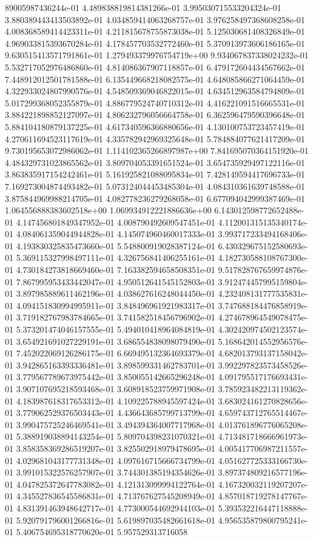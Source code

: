 89005987436244e-01	4.489838819814381266e-01	3.995030715533204324e-01	3.880389443413503892e-01	4.034859414063268757e-01	3.976258497368608258e-01	4.008368589414423311e-01	4.211815678755873038e-01	5.125030681408326849e-01	4.969033815393670284e-01	4.178457703532772460e-01	5.370913973606186165e-01	9.630515413571791861e-01	1.279493379976754719e+00	9.934067837338024232e-01	5.532717052976486860e-01	4.814086367907118857e-01	6.479172604434567662e-01	7.448912012501781588e-01	6.135449668218082575e-01	4.648085866271064459e-01	4.322933024807990576e-01	4.548509369046822015e-01	4.634512963584794809e-01	5.017299368052355879e-01	4.886779524740710312e-01	4.416221091516665531e-01	3.884221898852127097e-01	4.806232796056664758e-01	6.362596479590396648e-01	5.884104180879137225e-01	4.617340596366880656e-01	4.130100753723457419e-01	4.270611694523117619e-01	4.335782942969325648e-01	5.784884077621417209e-01	9.730195653072986062e-01	1.114102365266897987e+00	7.841695070364151920e-01	4.484329731023865562e-01	3.809704053391651524e-01	3.654735929497122116e-01	3.863835917154242461e-01	5.161925821088095834e-01	7.428149594417696733e-01	7.169273004874493482e-01	5.073124044453485304e-01	4.084310361639748588e-01	3.875844969988214705e-01	4.082778236279268058e-01	6.677094042999387469e-01	1.064556888383602518e+00	1.069934912221886636e+00	6.143012598772652488e-01	4.147456801849347952e-01	4.008790492609547451e-01	4.112001315135340174e-01	4.084061359044944828e-01	4.145074960460017333e-01	3.993717233494168406e-01	4.193830325835473660e-01	5.548800919028387124e-01	6.430329675152580693e-01	5.369115327998497111e-01	4.326756841406255161e-01	4.182730588108767300e-01	4.730184273818669460e-01	7.163382594658508351e-01	9.517828767659974876e-01	7.867995953433442047e-01	4.950512641545152803e-01	3.912474457995159804e-01	3.897985889611462196e-01	4.038627616248044450e-01	4.232408131777535831e-01	4.094151830994995911e-01	3.848496961921983317e-01	3.747688184476858919e-01	3.719182767983784665e-01	3.741582518456796902e-01	4.274678964549078475e-01	5.373201474046157555e-01	5.494010418964084819e-01	4.302420974502123574e-01	3.654921691027229191e-01	3.686554838098079490e-01	5.168642014552956576e-01	7.452022069126286175e-01	6.669495132364693379e-01	4.682013793137158042e-01	3.942865163393336481e-01	3.898599331462783701e-01	3.992297823573458526e-01	3.779567789673975442e-01	3.850055142665296248e-01	4.091795517176693431e-01	3.907107695218593468e-01	3.608918523759971908e-01	3.785923482213119362e-01	4.183987618317653312e-01	4.109225788945597424e-01	3.683024161270828656e-01	3.779062529376503443e-01	4.436643685799713799e-01	4.659743712765514467e-01	3.990475725246469541e-01	3.494394364007717968e-01	4.013761896776065208e-01	5.388919038894143254e-01	5.809704398231070321e-01	4.713481718666961973e-01	3.858358369286519207e-01	3.825502918979478695e-01	4.005417706987211557e-01	4.029681043177731348e-01	4.097616715666734799e-01	4.051627725333166730e-01	3.991015322576257907e-01	3.744301385194354626e-01	3.897374809216577196e-01	4.047825372647783082e-01	4.121313099994122764e-01	4.167320032119207207e-01	4.345527836545586831e-01	4.713767627545208949e-01	4.857018719278147767e-01	4.831391463948642717e-01	4.773000544692944103e-01	5.393532216447118888e-01	5.920791796001266816e-01	5.619897035482661618e-01	4.956535879800795241e-01	5.406754695318770620e-01	5.957529313716058